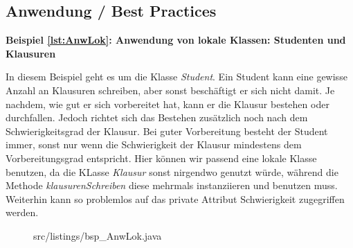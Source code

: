 \subsection{Anwendung / Best Practices}

{\bf Beispiel \ref{lst:AnwLok}: Anwendung von lokale Klassen: Studenten und Klausuren}

In diesem Beispiel geht es um die Klasse {\it Student}.
Ein Student kann eine gewisse Anzahl an Klausuren schreiben, aber sonst beschäftigt er sich nicht damit.
Je nachdem, wie gut er sich vorbereitet hat, kann er die Klausur bestehen oder durchfallen.
Jedoch richtet sich das Bestehen zusätzlich noch nach dem Schwierigkeitsgrad der Klausur.
Bei guter Vorbereitung besteht der Student immer, sonst nur wenn die  Schwierigkeit der Klausur mindestens dem Vorbereitungsgrad entspricht.
Hier können wir passend eine lokale Klasse benutzen, da die KLasse {\it Klausur} sonst nirgendwo genutzt würde, während die Methode {\it klausurenSchreiben} diese mehrmals instanziieren und benutzen muss.
Weiterhin kann so problemlos auf das private Attribut Schwierigkeit zugegriffen werden.
\\

\begin{figure}[htb]
\lstset{language=Java}
 {src/listings/bsp_AnwLok.java}
\end{figure}
\newpage
